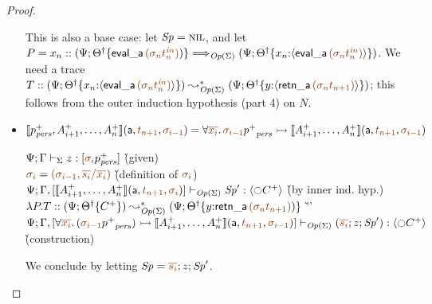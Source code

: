 \begin{proof}
\begin{itemize}
  \smallskip
  This is also a base case: let ${\it Sp} = \textsc{nil}$, and let
  $P = x_n :: (\Psi; 
  \tackon{\opsubst{\Theta}}
  {{\sf eval\_a}\,\lf{(\sigma_{n}{t^{\it in}_n})})} \Longrightarrow_{\transop{\Sigma}}
   (\Psi; 
  \tackon{\opsubst{\Theta}}
  {x_{n}{:}{\susp{{\sf eval\_a}\,\lf{(\sigma_{n}{t^{\it in}_n})}}}})$.
We need a trace $T :: (\Psi; 
  \tackon{\opsubst{\Theta}}
  {x_{n}{:}{\susp{{\sf eval\_a}\,\lf{(\sigma_{n}{t^{\it in}_n})}}}})
  \leadsto^*_{\transop{\Sigma}} 
  (\Psi; \tackon{\opsubst{\Theta}}{y{:}\susp{{\sf retn\_a}\,\lf{(\sigma_n{t_{n+1}})}}})$; 
  this follows from the
  outer induction hypothesis (part 4) on $N$. 
  \bigskip

\item $\opbasic{p^+_\mpers,A^+_{i+1},\ldots,A^+_n}{t_{n+1}}{\sigma_{i-1}} 
  = \forall \lf{\overline{x_i}}.\, \lf{\sigma_{i-1}}{p^+}_\mpers \lefti \opbasic{A^+_{i+1},\ldots,A^+_n}{t_{n+1}}{\sigma_{i-1}}$

  \begin{tabbing}
  $\slst{\Sigma}{\Psi}{\Gamma}{z}{[\lf{\sigma_i}{p^+_\mpers}]}$
  \` (given) 
  \\
  $\lf{\sigma_i} = \lf{(\sigma_{i-1}, \overline{s_i}/\overline{x_i})}$
  \` (definition of $\lf{\sigma_i}$)
  \\
  $\slst{\transop{\Sigma}}{\Psi}{\Gamma, [\opbasic{A^+_{i+1},\ldots,A^+_n}{t_{n+1}}{\sigma_{i}}]}{\Sp'}{\susp{{\ocircle} C^+ }}$
  \` (by inner ind. hyp.)
  \\
  $\lambda P.T :: (\Psi; \tackon{\opsubst{\Theta}}{C^+}) 
     \leadsto^*_{\transop{\Sigma}}
   (\Psi; \tackon{\opsubst{\Theta}}{y{:}{\sf retn\_a}\,\lf{({\sigma_n}t_{n+1})})}$
 \` ''\qquad\qquad~
  \\
  $\slst{\transop{\Sigma}}{\Psi}
    {\Gamma, [\forall \lf{\overline{x_i}}.\, (\lf{\sigma_{i-1}}{p^+}_\mpers)
                \lefti \opbasic{A^+_{i+1},\ldots,A^+_n}{t_{n+1}}{\sigma_{i-1}}]}
    {(\lf{\overline{s_i}}; z; \Sp')}
    {\susp{{\ocircle}C^+ }}$
  \\ 
  \` (construction)
  \end{tabbing}
  We conclude  by letting $\Sp = \lf{\overline{s_i}}; z; \Sp'$.
  \bigskip


\end{itemize}
\end{proof}
